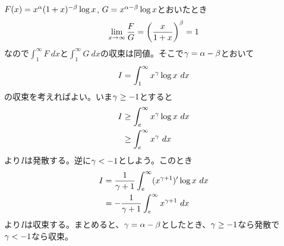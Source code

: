 \subsubsection{}%
\begin{sol}
  $F(x) = x^{{\alpha}} (1+x)^{- \beta} \log x $, $G = x^{{\alpha} - \beta } \log x$とおいたとき
  \[
  \lim_{x \to \infty} \frac{F}{G} = \left( \frac{x}{1+x} \right)^{\beta} = 1
  \]
  なので$\int_1^{\infty} F \ dx$と$\int_1^{\infty} G \ dx$の収束は同値。そこで${\gamma} = {\alpha} - \beta$とおいて
  \[
  I = \int_1^{\infty} x^{{\gamma}} \log x \ dx
  \]
  の収束を考えればよい。いま${\gamma} \geq -1$とすると
  \begin{align*}
    I &\geq \int_e^{\infty} x^{{\gamma}} \log x \ dx \\
    &\geq \int_e^{\infty} x^{{\gamma}}  \ dx
  \end{align*}
  より$I$は発散する。逆に${\gamma} < -1$としよう。このとき
  \begin{align*}
I &= \frac{1}{{\gamma} + 1} \int_e^{\infty} (x^{{\gamma} + 1})' \log x \ dx \\
&= - \frac{1}{{\gamma} + 1} \int_e^{\infty} x^{{\gamma} + 1} \ dx
  \end{align*}
  より$I$は収束する。まとめると、${\gamma} = {\alpha} - \beta$としたとき、${\gamma} \geq -1$なら発散で${\gamma} < -1$なら収束。
\end{sol}
